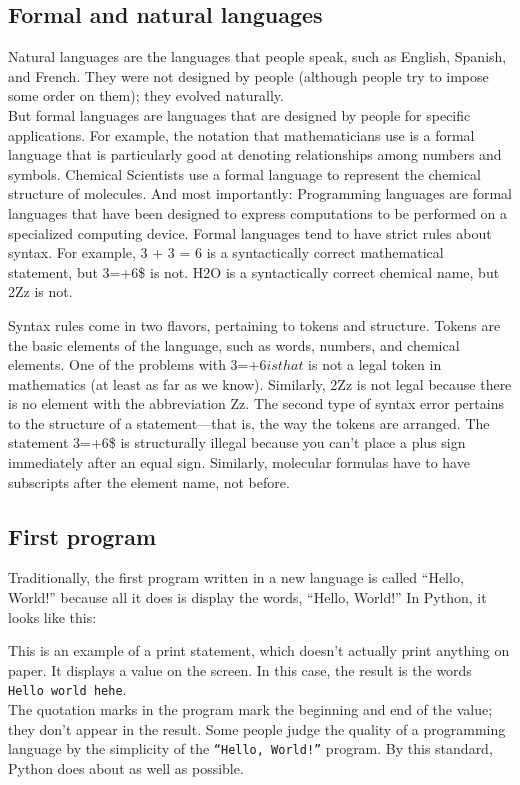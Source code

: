 \subsection{Formal and natural languages}
\noindent Natural languages are the languages that people speak, such as English, Spanish, and French. They were not designed by people (although people try to impose some order on them); they evolved naturally.\\

But formal languages are languages that are designed by people for specific applications. For example, the notation that mathematicians use is a formal language that is particularly good at denoting relationships among numbers and symbols. Chemical Scientists use a formal language to represent the chemical structure of molecules. And most importantly:
Programming languages are formal languages that have been designed to express computations to be performed on a specialized computing device.
Formal languages tend to have strict rules about syntax. For example, 3 + 3 = 6 is a syntactically correct mathematical statement, but 3=+6\$ is not. H2O is a syntactically correct chemical name, but 2Zz is not.

Syntax rules come in two flavors, pertaining to tokens and structure. Tokens are the basic elements of the language, such as words, numbers, and chemical elements. One of the problems with 3=+6$ is that $ is not a legal token in mathematics (at least as far as we know). Similarly, 2Zz is not legal because there is no element with the abbreviation Zz.
The second type of syntax error pertains to the structure of a statement—that is, the way the tokens are arranged. The statement 3=+6\$ is structurally illegal because you can’t place a plus sign immediately after an equal sign. Similarly, molecular formulas have to have subscripts after the element name, not before.

\subsection{First program}
Traditionally, the first program written in a new language is called “Hello, World!” because all it does is display the words, “Hello, World!” In Python, it looks like this:

\noindent\begin{minipage}{\linewidth}

\end{minipage}

\noindent This is an example of a print statement, which doesn’t actually print anything on paper. It displays a value on the screen. In this case, the result is the words \texttt{Hello world hehe}.\\

\noindent The quotation marks in the program mark the beginning and end of the value; they don’t appear in the result.
Some people judge the quality of a programming language by the simplicity of the \texttt{“Hello, World!”} program. By this standard, Python does about as well as possible.

